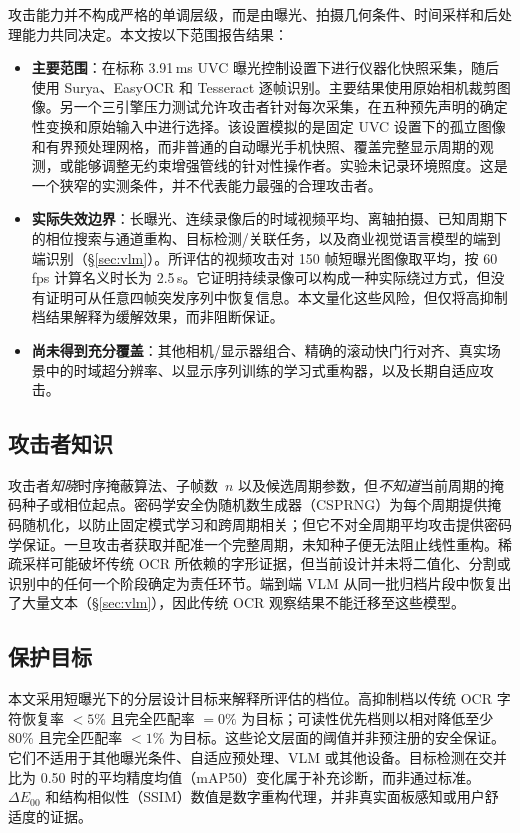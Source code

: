 \documentclass{ieeeaccess}
\begin{document}
攻击能力并不构成严格的单调层级，而是由曝光、拍摄几何条件、时间采样和后处理能力共同决定。本文按以下范围报告结果：
\begin{itemize}
\item \textbf{主要范围}：在标称 3.91\,ms UVC 曝光控制设置下进行仪器化快照采集，随后使用 Surya、EasyOCR 和 Tesseract 逐帧识别。主要结果使用原始相机裁剪图像。另一个三引擎压力测试允许攻击者针对每次采集，在五种预先声明的确定性变换和原始输入中进行选择。该设置模拟的是固定 UVC 设置下的孤立图像和有界预处理网格，而非普通的自动曝光手机快照、覆盖完整显示周期的观测，或能够调整无约束增强管线的针对性操作者。实验未记录环境照度。这是一个狭窄的实测条件，并不代表能力最强的合理攻击者。
\item \textbf{实际失效边界}：长曝光、连续录像后的时域视频平均、离轴拍摄、已知周期下的相位搜索与通道重构、目标检测/关联任务，以及商业视觉语言模型的端到端识别（\S\ref{sec:vlm}）。所评估的视频攻击对 150 帧短曝光图像取平均，按 60\,fps 计算名义时长为 2.5\,s。它证明持续录像可以构成一种实际绕过方式，但没有证明可从任意四帧突发序列中恢复信息。本文量化这些风险，但仅将高抑制档结果解释为缓解效果，而非阻断保证。
\item \textbf{尚未得到充分覆盖}：其他相机/显示器组合、精确的滚动快门行对齐、真实场景中的时域超分辨率、以显示序列训练的学习式重构器，以及长期自适应攻击。
\end{itemize}

\subsection{攻击者知识}

攻击者\emph{知晓}时序掩蔽算法、子帧数~$n$ 以及候选周期参数，但\emph{不知道}当前周期的掩码种子或相位起点。密码学安全伪随机数生成器（CSPRNG）为每个周期提供掩码随机化，以防止固定模式学习和跨周期相关；但它不对全周期平均攻击提供密码学保证。一旦攻击者获取并配准一个完整周期，未知种子便无法阻止线性重构。稀疏采样可能破坏传统 OCR 所依赖的字形证据，但当前设计并未将二值化、分割或识别中的任何一个阶段确定为责任环节。端到端 VLM 从同一批归档片段中恢复出了大量文本（\S\ref{sec:vlm}），因此传统 OCR 观察结果不能迁移至这些模型。

\subsection{保护目标}

本文采用短曝光下的分层设计目标来解释所评估的档位。高抑制档以传统 OCR 字符恢复率 $<5\%$ 且完全匹配率 $=0\%$ 为目标；可读性优先档则以相对降低至少 80\% 且完全匹配率 $<1\%$ 为目标。这些论文层面的阈值并非预注册的安全保证。它们不适用于其他曝光条件、自适应预处理、VLM 或其他设备。目标检测在交并比为 0.50 时的平均精度均值（mAP50）变化属于补充诊断，而非通过标准。$\Delta E_{00}$ 和结构相似性（SSIM）数值是数字重构代理，并非真实面板感知或用户舒适度的证据。
\end{document}
